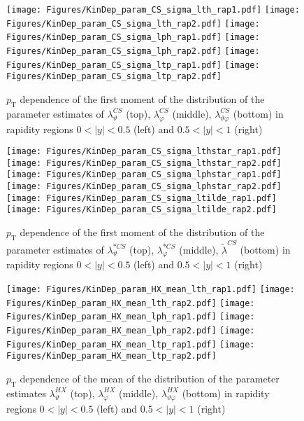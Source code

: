 \documentclass[12pt]{article}
\newcommand{\pT}{p_\mathrm{T}}
\newcommand{\absy}{\left |  y \right |}
\newcommand{\lamthCS}{\lambda^{\scriptscriptstyle CS}_\vartheta}
\newcommand{\lamphCS}{\lambda^{\scriptscriptstyle CS}_\varphi}
\newcommand{\lamthphCS}{\lambda^{\scriptscriptstyle CS}_{\vartheta \varphi}}
\newcommand{\lamtildeCS}{\tilde{\lambda}^{\scriptscriptstyle CS}}
\newcommand{\lamthstarCS}{\lambda^{* \scriptscriptstyle CS}_\vartheta}
\newcommand{\lamphstarCS}{\lambda^{* \scriptscriptstyle CS}_\varphi}
\newcommand{\lamthHX}{\lambda^{\scriptscriptstyle HX}_\vartheta}
\newcommand{\lamphHX}{\lambda^{\scriptscriptstyle HX}_\varphi}
\newcommand{\lamthphHX}{\lambda^{\scriptscriptstyle HX}_{\vartheta \varphi}}
\begin{document}
\begin{figure}[htbp]
\centering
\texttt{[image: Figures/KinDep\_param\_CS\_sigma\_lth\_rap1.pdf]}
\texttt{[image: Figures/KinDep\_param\_CS\_sigma\_lth\_rap2.pdf]}
\texttt{[image: Figures/KinDep\_param\_CS\_sigma\_lph\_rap1.pdf]}
\texttt{[image: Figures/KinDep\_param\_CS\_sigma\_lph\_rap2.pdf]}
\texttt{[image: Figures/KinDep\_param\_CS\_sigma\_ltp\_rap1.pdf]}
\texttt{[image: Figures/KinDep\_param\_CS\_sigma\_ltp\_rap2.pdf]}
\caption{$\pT$ dependence of the first moment of the distribution of the parameter estimates of $\lamthCS$ (top), $\lamphCS$ (middle), $\lamthphCS$ (bottom) in rapidity regions $0<\absy<0.5$ (left) and $0.5<\absy<1$ (right)}
\end{figure}
\clearpage

\begin{figure}[htbp]
\centering
\texttt{[image: Figures/KinDep\_param\_CS\_sigma\_lthstar\_rap1.pdf]}
\texttt{[image: Figures/KinDep\_param\_CS\_sigma\_lthstar\_rap2.pdf]}
\texttt{[image: Figures/KinDep\_param\_CS\_sigma\_lphstar\_rap1.pdf]}
\texttt{[image: Figures/KinDep\_param\_CS\_sigma\_lphstar\_rap2.pdf]}
\texttt{[image: Figures/KinDep\_param\_CS\_sigma\_ltilde\_rap1.pdf]}
\texttt{[image: Figures/KinDep\_param\_CS\_sigma\_ltilde\_rap2.pdf]}
\caption{$\pT$ dependence of the first moment of the distribution of the parameter estimates of $\lamthstarCS$ (top), $\lamphstarCS$ (middle), $\lamtildeCS$ (bottom) in rapidity regions $0<\absy<0.5$ (left) and $0.5<\absy<1$ (right)}
\end{figure}
\clearpage









\begin{figure}[htbp]
\centering
\texttt{[image: Figures/KinDep\_param\_HX\_mean\_lth\_rap1.pdf]}
\texttt{[image: Figures/KinDep\_param\_HX\_mean\_lth\_rap2.pdf]}
\texttt{[image: Figures/KinDep\_param\_HX\_mean\_lph\_rap1.pdf]}
\texttt{[image: Figures/KinDep\_param\_HX\_mean\_lph\_rap2.pdf]}
\texttt{[image: Figures/KinDep\_param\_HX\_mean\_ltp\_rap1.pdf]}
\texttt{[image: Figures/KinDep\_param\_HX\_mean\_ltp\_rap2.pdf]}
\caption{$\pT$ dependence of the mean of the distribution of the parameter estimates $\lamthHX$ (top), $\lamphHX$ (middle), $\lamthphHX$ (bottom) in rapidity regions $0<\absy<0.5$ (left) and $0.5<\absy<1$ (right)}
\end{figure}
\clearpage
\end{document}
